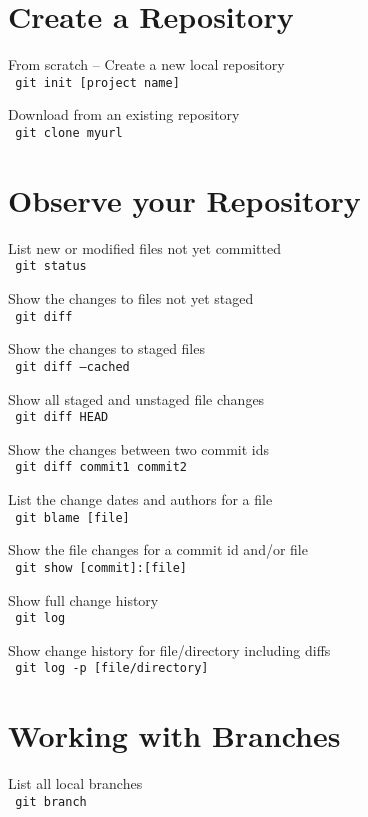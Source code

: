 \documentclass[a4paper, twoside, 11pt]{extarticle}
\begin{document}
\begin{multicols*}{2}
\section{Create a Repository}
From scratch -- Create a new local repository \\ \texttt{\color{blue} git init [project name]}

Download from an existing repository \\ \texttt{\color{blue} git clone myurl}

\section{Observe your Repository}
List new or modified files not yet
committed \\ \texttt{\color{blue} git status}

Show the changes to files not yet staged \\ \texttt{\color{blue} git diff}

Show the changes to staged files \\ \texttt{\color{blue} git diff --cached}

Show all staged and unstaged
file changes \\ \texttt{\color{blue} git diff HEAD}

Show the changes between two
commit ids \\ \texttt{\color{blue} git diff commit1 commit2}

List the change dates and authors
for a file \\ \texttt{\color{blue} git blame [file]}

Show the file changes for a commit
id and/or file \\ \texttt{\color{blue} git show [commit]:[file]}

Show full change history \\ \texttt{\color{blue} git log}

Show change history for file/directory
including diffs \\ \texttt{\color{blue} git log -p [file/directory]}


\section{Working with Branches}
List all local branches \\ \texttt{\color{blue} git branch}


\end{multicols*}
\end{document}
